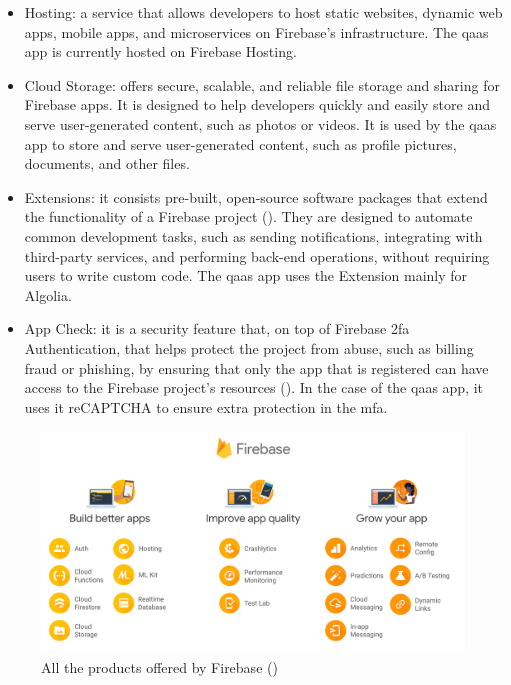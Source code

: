 \begin{itemize}
      \item Hosting: a service that allows developers to host static websites, dynamic web apps, mobile apps, and
            microservices on Firebase's infrastructure. The \acrshort{qaas} app is currently hosted on Firebase
            Hosting.
      \item Cloud Storage: offers secure, scalable, and reliable file storage and sharing for Firebase apps.
            It is designed to help developers quickly and easily store and serve user-generated content, such as
            photos or videos. It is used by the \acrshort{qaas} app to store and serve user-generated content, such as
            profile pictures, documents, and other files.
      \item Extensions: it consists pre-built, open-source software packages that extend the functionality of a Firebase
            project (\textit{\cite{firebaseExtension}}). They are designed to automate common development tasks, such as
            sending notifications, integrating with third-party services, and performing back-end operations, without
            requiring users to write custom code. The \acrshort{qaas} app uses the Extension mainly for Algolia.
      \item App Check: it is a security feature that, on top of Firebase \acrshort{2fa} Authentication, that helps protect
            the project from abuse, such as billing fraud or phishing, by ensuring that only the app that is registered
            can have access to the Firebase project's resources (\textit{\cite{appCheckFirebase}}). In the case of the
            \acrshort{qaas} app, it uses it \gls{reCAPTCHA} to ensure extra protection in the \acrshort{mfa}.
\end{itemize}

\begin{figure}[H]
      \centering
      \includegraphics[width=1.0\textwidth]{Figures/Firebase.png}
      \caption{All the products offered by Firebase (\textit{\cite{firebasePic}})}
\end{figure}

